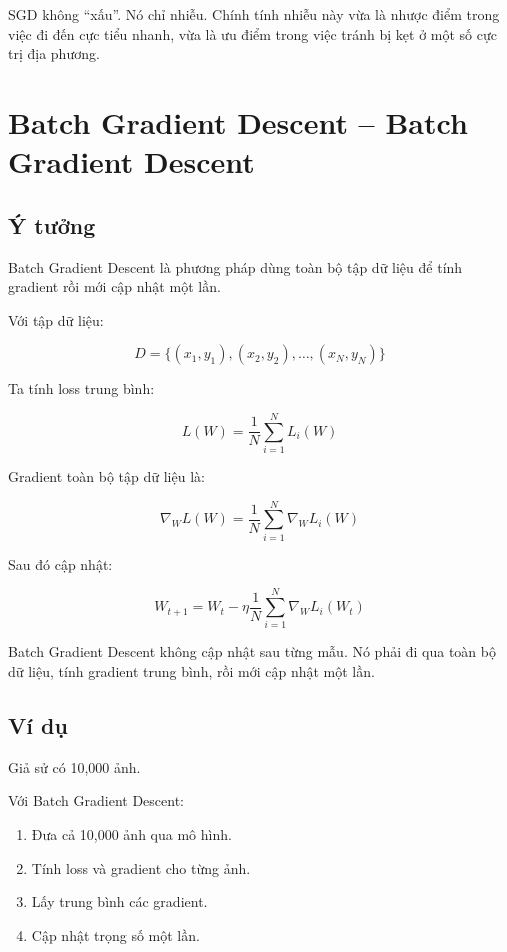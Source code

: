 \begin{luuy}
SGD không ``xấu''. Nó chỉ nhiễu. Chính tính nhiễu này vừa là nhược điểm trong việc đi đến cực tiểu nhanh, vừa là ưu điểm trong việc tránh bị kẹt ở một số cực trị địa phương.
\end{luuy}

\section{Batch Gradient Descent -- Batch Gradient Descent}

\subsection{Ý tưởng}

Batch Gradient Descent là phương pháp dùng toàn bộ tập dữ liệu để tính gradient rồi mới cập nhật một lần.

Với tập dữ liệu:

\[
    D=\{(x_1,y_1),(x_2,y_2),\ldots,(x_N,y_N)\}
\]

Ta tính loss trung bình:

\[
    L(W)
    =
    \frac{1}{N}
    \sum_{i=1}^{N}L_i(W)
\]

Gradient toàn bộ tập dữ liệu là:

\[
    \nabla_W L(W)
    =
    \frac{1}{N}
    \sum_{i=1}^{N}
    \nabla_W L_i(W)
\]

Sau đó cập nhật:

\[
    W_{t+1}
    =
    W_t
    -
    \eta
    \frac{1}{N}
    \sum_{i=1}^{N}
    \nabla_W L_i(W_t)
\]

\begin{ghinho}
Batch Gradient Descent không cập nhật sau từng mẫu. Nó phải đi qua toàn bộ dữ liệu, tính gradient trung bình, rồi mới cập nhật một lần.
\end{ghinho}

\subsection{Ví dụ}

Giả sử có 10,000 ảnh.

Với Batch Gradient Descent:

\begin{enumerate}
    \item Đưa cả 10,000 ảnh qua mô hình.
    \item Tính loss và gradient cho từng ảnh.
    \item Lấy trung bình các gradient.
    \item Cập nhật trọng số một lần.
\end{enumerate}

